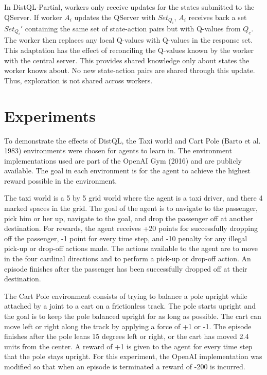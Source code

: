 \documentclass[jair,twoside,11pt,theapa]{article}
\begin{document}
In DistQL-Partial, workers only receive updates for the states submitted to the QServer. If worker $A_i$ updates the QServer with $Set_{Q_i}$, $A_i$ receives back a set $Set_{Q_i}'$ containing the same set of state-action pairs but with Q-values from $Q_c$. The worker then replaces any local Q-values with Q-values in the response set. This adaptation has the effect of reconciling the Q-values known by the worker with the central server. This provides shared knowledge only about states the worker knows about. No new state-action pairs are shared through this update. Thus, exploration is not shared across workers. 



\section{Experiments}
\label{experiments}
To demonstrate the effects of DistQL, the Taxi world \cite{Dietterich2000} and Cart Pole (Barto et al. 1983)\nocite{Barto83} environments were chosen for agents to learn in. The environment implementations used are part of the OpenAI Gym (2016) \nocite{gym} and are publicly available. The goal in each environment is for the agent to achieve the highest reward possible in the environment. 

The taxi world is a 5 by 5 grid world where the agent is a taxi driver, and there 4 marked spaces in the grid. The goal of the agent is to navigate to the passenger, pick him or her up, navigate to the goal, and drop the passenger off at another destination. For rewards, the agent receives +20 points for successfully dropping off the passenger, -1 point for every time step, and -10 penalty for any illegal pick-up or drop-off actions made. The actions available to the agent are to move in the four cardinal directions and to perform a pick-up or drop-off action. An episode finishes after the passenger has been successfully dropped off at their destination.

The Cart Pole environment consists of trying to balance a pole upright while attached by a joint to a cart on a frictionless track. The pole starts upright and the goal is to keep the pole balanced upright for as long as possible. The cart can move left or right along the track by applying a force of +1 or -1. The episode finishes after the pole leans 15 degrees left or right, or the cart has moved 2.4 units from the center. A reward of +1 is given to the agent for every time step that the pole stays upright. For this experiment, the OpenAI implementation was modified so that when an episode is terminated a reward of -200 is incurred. 
\end{document}
